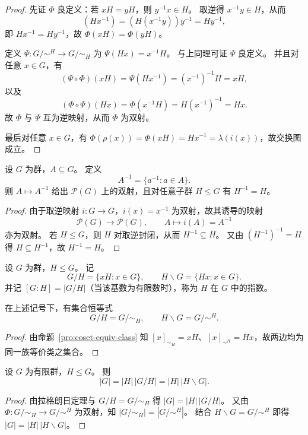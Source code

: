 \documentclass[lang=cn,a4paper,newtx]{elegantbook}
\begin{document}
\begin{proof}
先证 $\Phi$ 良定义：若 $xH=yH$，则 $y^{-1}x\in H$。
取逆得 $x^{-1}y\in H$，从而
\[
  (Hx^{-1})=(H(x^{-1}y))y^{-1}=Hy^{-1},
\]
即 $Hx^{-1}=Hy^{-1}$，故 $\Phi(xH)=\Phi(yH)$。

定义 $\Psi:G/\!\sim^{H}\to G/\!\sim_H$ 为 $\Psi(Hx)=x^{-1}H$。
与上同理可证 $\Psi$ 良定义。
并且对任意 $x\in G$，有
\[
  (\Psi\circ\Phi)(xH)=\Psi(Hx^{-1})=(x^{-1})^{-1}H=xH,
\]
以及
\[
  (\Phi\circ\Psi)(Hx)=\Phi(x^{-1}H)=H(x^{-1})^{-1}=Hx.
\]
故 $\Phi$ 与 $\Psi$ 互为逆映射，从而 $\Phi$ 为双射。

最后对任意 $x\in G$，有 $\Phi(\rho(x))=\Phi(xH)=Hx^{-1}=\lambda(i(x))$，故交换图成立。
\end{proof}

\begin{proposition}
设 $G$ 为群，$A\subseteq G$。
定义
\[
  A^{-1}=\{a^{-1}:a\in A\}.
\]
则 $A\mapsto A^{-1}$ 给出 $\mathcal P(G)$ 上的双射，且对任意子群 $H\le G$ 有 $H^{-1}=H$。
\end{proposition}

\begin{proof}
由于取逆映射 $i:G\to G$，$i(x)=x^{-1}$ 为双射，故其诱导的映射
\[
  \mathcal P(G)\to\mathcal P(G),\qquad A\mapsto i(A)=A^{-1}
\]
亦为双射。
若 $H\le G$，则 $H$ 对取逆封闭，从而 $H^{-1}\subseteq H$。
又由 $(H^{-1})^{-1}=H$ 得 $H\subseteq H^{-1}$，故 $H^{-1}=H$。
\end{proof}

\begin{definition}
设 $G$ 为群，$H\le G$。
记
\[
  G/H=\{xH:x\in G\},\qquad H\backslash G=\{Hx:x\in G\}.
\]
并记 $[G:H]=|G/H|$（当该基数为有限数时），称为 $H$ 在 $G$ 中的指数。
\end{definition}

\begin{proposition}
在上述记号下，有集合恒等式
\[
  G/H=G/\!\sim_H,\qquad H\backslash G=G/\!\sim^{H}.
\]
\end{proposition}

\begin{proof}
由命题~\ref{pro:coset-equiv-class} 知 $[x]_{\sim_H}=xH$、$[x]_{\sim^{H}}=Hx$，故两边均为同一族等价类之集合。
\end{proof}

\begin{corollary}
设 $G$ 为有限群，$H\le G$。
则
\[
  |G|=|H|\,|G/H|=|H|\,|H\backslash G|.
\]
\end{corollary}

\begin{proof}
由拉格朗日定理与 $G/H=G/\!\sim_H$ 得 $|G|=|H|\,|G/H|$。
又由 $\Phi:G/\!\sim_H\to G/\!\sim^{H}$ 为双射，知 $|G/\!\sim_H|=|G/\!\sim^{H}|$。
结合 $H\backslash G=G/\!\sim^{H}$ 即得 $|G|=|H|\,|H\backslash G|$。
\end{proof}
\end{document}
